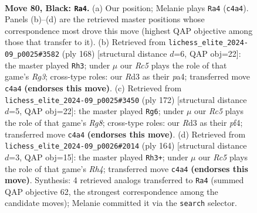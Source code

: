 \documentclass[11pt]{article}
\begin{document}
\clearpage

\begin{figure}[p]\centering
\begin{subfigure}{0.46\textwidth}\centering
\resizebox{\linewidth}{!}{%
\newchessgame
\chessboard[
  setfen={7k/1R6/8/6K1/2r4P/3r4/8/8 b - - 2 80},
  showmover=false,
  pgfstyle=straightmove, color=movearrow, markmove={c4-a4}
]}
\caption{}
\end{subfigure}\hfill
\begin{subfigure}{0.46\textwidth}\centering
\resizebox{\linewidth}{!}{%
\newchessgame
\chessboard[
  setfen={8/8/8/8/p2K4/1p4R1/k7/2r5 w - - 10 85},
  showmover=false,
  pgfstyle=straightmove, color=movearrow, markmove={g3-h3}
]}
\caption{}
\end{subfigure}
\\[4pt]
\begin{subfigure}{0.46\textwidth}\centering
\resizebox{\linewidth}{!}{%
\newchessgame
\chessboard[
  setfen={6R1/8/7K/r7/5p2/6p1/5k2/8 w - - 12 87},
  showmover=false,
  pgfstyle=straightmove, color=movearrow, markmove={g8-g6}
]}
\caption{}
\end{subfigure}\hfill
\begin{subfigure}{0.46\textwidth}\centering
\resizebox{\linewidth}{!}{%
\newchessgame
\chessboard[
  setfen={8/8/8/8/4p2R/2K2k2/r7/8 w - - 10 83},
  showmover=false,
  pgfstyle=straightmove, color=movearrow, markmove={h4-h3}
]}
\caption{}
\end{subfigure}
\caption{\textbf{Move 80, Black: \texttt{Ra4}.} (a) Our position; Melanie plays \texttt{Ra4} (\texttt{c4a4}). Panels (b)--(d) are the retrieved master positions whose correspondence most drove this move (highest QAP objective among those that transfer to it). (b) Retrieved from \texttt{lichess\_elite\_2024-09\_p0025\#3582} (ply 168) [structural distance $d$=6, QAP obj=22]: the master played \texttt{Rh3}; under $\mu$ our \emph{Rc5} plays the role of that game's \emph{Rg3}; cross-type roles: our \emph{R}d3 as their \emph{p}a4; transferred move \texttt{c4a4} \textbf{(endorses this move)}. (c) Retrieved from \texttt{lichess\_elite\_2024-09\_p0025\#3450} (ply 172) [structural distance $d$=5, QAP obj=22]: the master played \texttt{Rg6}; under $\mu$ our \emph{Rc5} plays the role of that game's \emph{Rg8}; cross-type roles: our \emph{R}d3 as their \emph{p}f4; transferred move \texttt{c4a4} \textbf{(endorses this move)}. (d) Retrieved from \texttt{lichess\_elite\_2024-09\_p0026\#2014} (ply 164) [structural distance $d$=3, QAP obj=15]: the master played \texttt{Rh3+}; under $\mu$ our \emph{Rc5} plays the role of that game's \emph{Rh4}; transferred move \texttt{c4a4} \textbf{(endorses this move)}. Synthesis: 4 retrieved analogs transferred to \texttt{Ra4} (summed QAP objective 62, the strongest correspondence among the candidate moves); Melanie committed it via the \texttt{search} selector.}
\label{fig:thought-m159}
\end{figure}
\end{document}
